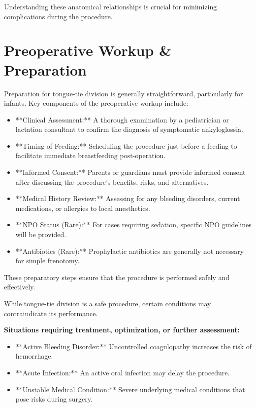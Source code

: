 Understanding these anatomical relationships is crucial for minimizing complications during the procedure.

\section*{Preoperative Workup \& Preparation}
Preparation for tongue-tie division is generally straightforward, particularly for infants. Key components of the preoperative workup include:

\begin{itemize}
  \item **Clinical Assessment:** A thorough examination by a pediatrician or lactation consultant to confirm the diagnosis of symptomatic ankyloglossia.
  \item **Timing of Feeding:** Scheduling the procedure just before a feeding to facilitate immediate breastfeeding post-operation.
  \item **Informed Consent:** Parents or guardians must provide informed consent after discussing the procedure's benefits, risks, and alternatives.
  \item **Medical History Review:** Assessing for any bleeding disorders, current medications, or allergies to local anesthetics.
  \item **NPO Status (Rare):** For cases requiring sedation, specific NPO guidelines will be provided.
  \item **Antibiotics (Rare):** Prophylactic antibiotics are generally not necessary for simple frenotomy.
\end{itemize}

These preparatory steps ensure that the procedure is performed safely and effectively.

While tongue-tie division is a safe procedure, certain conditions may contraindicate its performance.

\textbf{Situations requiring treatment, optimization, or further assessment:}
\begin{itemize}
  \item **Active Bleeding Disorder:** Uncontrolled coagulopathy increases the risk of hemorrhage.
  \item **Acute Infection:** An active oral infection may delay the procedure.
  \item **Unstable Medical Condition:** Severe underlying medical conditions that pose risks during surgery.
\end{itemize}

